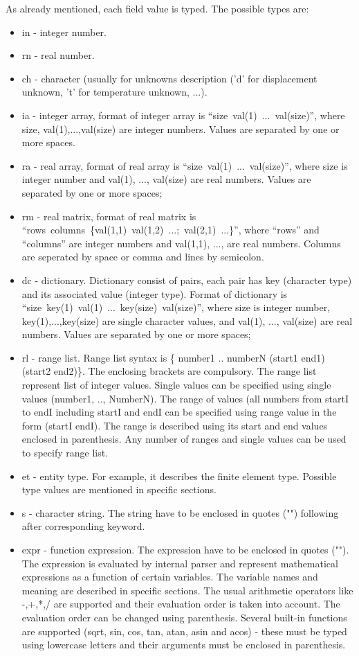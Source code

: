 \documentclass[a4paper]{article}
\begin{document}
As already mentioned, each field value is typed. The possible types are:
\begin{itemize}
\item in - integer number.
\item rn - real number.
\item ch - character (usually for unknowns description ('d' for
displacement unknown, 't' for temperature unknown, ...).
\item ia - integer array, format of integer array is
``size~val(1)~...~val(size)'', where size, val(1),...,val(size) are
integer numbers. Values are separated by one or more spaces.
\item ra - real array, format of real array is
``size~val(1)~...~val(size)'', where size is integer number and val(1),
..., val(size) are real numbers. Values are separated by one or more spaces;
\item rm - real matrix, format of real matrix is\\
``rows~columns~\{val(1,1)~val(1,2)~...;~val(2,1)~...\}'', where ``rows'' and ``columns'' are integer numbers and val(1,1),
..., are real numbers. Columns are seperated by space or comma and lines by semicolon.
\item dc - dictionary. Dictionary consist of pairs, each pair has key
(character type) and its associated value (integer type).
Format of dictionary is
``size~key(1)~val(1)~...~key(size)~val(size)'', where size is integer
number, key(1),...,key(size) are single character values, and val(1),
..., val(size) are real numbers. Values are separated by one or more spaces;
\item rl - range list. Range list syntax is \{ number1 .. numberN (start1
end1) (start2 end2)\}. The enclosing brackets are compulsory. The range
list represent list of integer values. Single values can be specified
using single values (number1, .., NumberN). The range of values
(all numbers from startI to endI including startI and endI can be
specified using range value in the form (startI endI). The range is
described using its start and end values enclosed in parenthesis.
Any number of ranges and single values can be used to specify range list.
\item et - entity type. For  example, it describes the finite element
type. Possible type values are mentioned in specific sections.
\item s - character string. The string have to be enclosed
in quotes ("") following after corresponding keyword.
\item expr - function expression. The expression have to be enclosed
in quotes (""). The expression is evaluated by internal parser and
represent mathematical expressions as a function of certain variables.
The variable names and meaning are described in specific sections.
The usual arithmetic operators like -,+,*,/ are supported and their
evaluation order is taken into account. The evaluation order can be
changed using parenthesis. Several built-in functions are supported
(sqrt, sin, cos, tan, atan, asin and acos) - these must be typed using
lowercase letters and their arguments must be enclosed in parenthesis.
\end{itemize}
\end{document}
